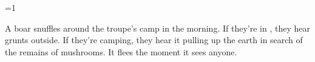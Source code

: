 \ifnum\value{cycle}=1


A boar snuffles around the troupe's camp in the morning.
If they're in , they hear grunts outside.
If they're camping, they hear it pulling up the earth in search of the remains of mushrooms.
It flees the moment it sees anyone.

\boar

\fi

